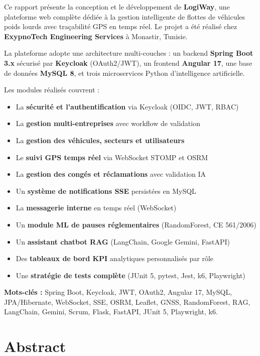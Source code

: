 \documentclass[12pt,a4paper]{report}
\begin{document}
Ce rapport présente la conception et le développement de \textbf{LogiWay},
une plateforme web complète dédiée à la gestion intelligente de flottes
de véhicules poids lourds avec traçabilité GPS en temps réel.
Le projet a été réalisé chez \textbf{ExypnoTech Engineering Services}
à Monastir, Tunisie.

La plateforme adopte une architecture multi-couches : un backend
\textbf{Spring Boot 3.x} sécurisé par \textbf{Keycloak} (OAuth2/JWT),
un frontend \textbf{Angular 17}, une base de données \textbf{MySQL 8},
et trois microservices Python d'intelligence artificielle.

\medskip
Les modules réalisés couvrent :
\begin{itemize}
  \item La \textbf{sécurité et l'authentification} via Keycloak (OIDC, JWT, RBAC)
  \item La \textbf{gestion multi-entreprises} avec workflow de validation
  \item La \textbf{gestion des véhicules, secteurs et utilisateurs}
  \item Le \textbf{suivi GPS temps réel} via WebSocket STOMP et OSRM
  \item La \textbf{gestion des congés et réclamations} avec validation IA
  \item Un \textbf{système de notifications SSE} persistées en MySQL
  \item La \textbf{messagerie interne} en temps réel (WebSocket)
  \item Un \textbf{module ML de pauses réglementaires} (RandomForest, CE 561/2006)
  \item Un \textbf{assistant chatbot RAG} (LangChain, Google Gemini, FastAPI)
  \item Des \textbf{tableaux de bord KPI} analytiques personnalisés par rôle
  \item Une \textbf{stratégie de tests complète} (JUnit 5, pytest, Jest, k6, Playwright)
\end{itemize}

\medskip
\textbf{Mots-clés :} Spring Boot, Keycloak, JWT, OAuth2, Angular 17,
MySQL, JPA/Hibernate, WebSocket, SSE, OSRM, Leaflet, GNSS, RandomForest,
RAG, LangChain, Gemini, Scrum, Flask, FastAPI, JUnit 5, Playwright, k6.

\newpage

\chapter*{Abstract}
\end{document}
